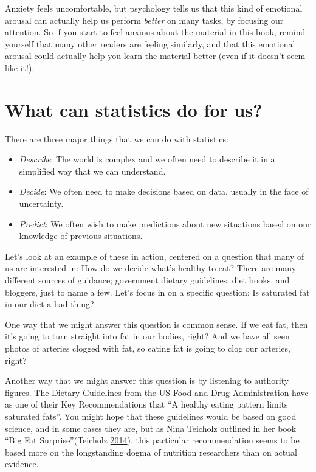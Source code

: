 \documentclass[12pt,]{book}
\providecommand{\tightlist}{%
  \setlength{\itemsep}{0pt}\setlength{\parskip}{0pt}}
\theoremstyle{definition}
\theoremstyle{definition}
\theoremstyle{definition}
\theoremstyle{remark}
\begin{document}
Anxiety feels uncomfortable, but psychology tells us that this kind of emotional arousal can actually help us perform \emph{better} on many tasks, by focusing our attention. So if you start to feel anxious about the material in this book, remind yourself that many other readers are feeling similarly, and that this emotional arousal could actually help you learn the material better (even if it doesn't seem like it!).

\hypertarget{what-can-statistics-do-for-us}{%
\section{What can statistics do for us?}\label{what-can-statistics-do-for-us}}

There are three major things that we can do with statistics:

\begin{itemize}
\tightlist
\item
  \emph{Describe}: The world is complex and we often need to describe it in a simplified way that we can understand.\\
\item
  \emph{Decide}: We often need to make decisions based on data, usually in the face of uncertainty.
\item
  \emph{Predict}: We often wish to make predictions about new situations based on our knowledge of previous situations.
\end{itemize}

Let's look at an example of these in action, centered on a question that many of us are interested in: How do we decide what's healthy to eat? There are many different sources of guidance; government dietary guidelines, diet books, and bloggers, just to name a few. Let's focus in on a specific question: Is saturated fat in our diet a bad thing?

One way that we might answer this question is common sense. If we eat fat, then it's going to turn straight into fat in our bodies, right? And we have all seen photos of arteries clogged with fat, so eating fat is going to clog our arteries, right?

Another way that we might answer this question is by listening to authority figures. The Dietary Guidelines from the US Food and Drug Administration have as one of their Key Recommendations that ``A healthy eating pattern limits saturated fats''. You might hope that these guidelines would be based on good science, and in some cases they are, but as Nina Teicholz outlined in her book ``Big Fat Surprise''(Teicholz \protect\hyperlink{ref-teic:2014}{2014}), this particular recommendation seems to be based more on the longstanding dogma of nutrition researchers than on actual evidence.
\end{document}
